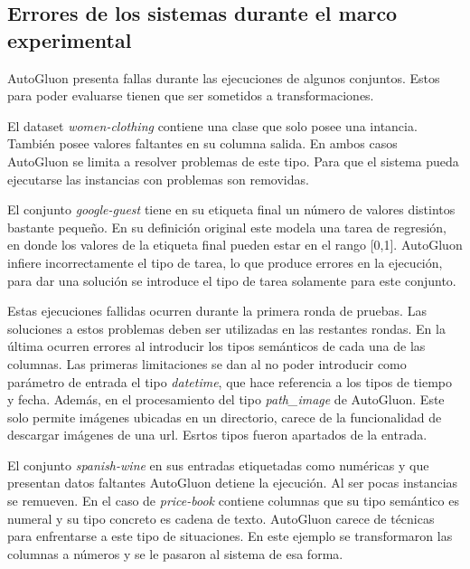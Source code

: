 

\subsection{Errores de los sistemas durante el marco experimental}\label{subsection:errors}
AutoGluon presenta fallas durante las ejecuciones de algunos conjuntos. Estos para poder evaluarse tienen que ser sometidos a transformaciones.

El dataset \textit{women-clothing} contiene una clase que solo posee una intancia. También posee valores faltantes en su columna salida. En ambos casos AutoGluon se 
limita a resolver problemas de este tipo. Para que el sistema pueda ejecutarse las instancias con problemas son removidas.

El conjunto \textit{google-guest} tiene en su etiqueta final un número de valores distintos bastante pequeño. En su definición original este modela una tarea de regresión, en 
donde los valores de la etiqueta final pueden estar en el rango [0,1]. AutoGluon infiere incorrectamente el tipo de tarea, lo que produce errores en la ejecución, para 
dar una solución se introduce el tipo de tarea solamente para este conjunto.

Estas ejecuciones fallidas ocurren durante la primera ronda de pruebas. Las soluciones a estos problemas deben ser utilizadas en las restantes rondas. 
En la última ocurren errores al introducir los tipos semánticos de cada una de las columnas. Las primeras limitaciones se dan al no poder introducir como 
parámetro de entrada el tipo \textit{datetime}, que hace referencia a los tipos de tiempo y fecha. Además, en el procesamiento del tipo \textit{path\_image} de AutoGluon. 
Este solo permite imágenes ubicadas en un directorio, carece de la funcionalidad de descargar imágenes de una url.  Esrtos tipos fueron apartados de la entrada.

El conjunto \textit{spanish-wine} en sus entradas etiquetadas como numéricas y que presentan datos faltantes AutoGluon detiene la ejecución. Al ser pocas instancias 
se remueven.
En el caso de \textit{price-book} contiene columnas que su tipo semántico es numeral y su tipo concreto es cadena de texto. AutoGluon carece de técnicas para 
enfrentarse a este tipo de situaciones. En este ejemplo se transformaron las columnas a números y se le pasaron al sistema de esa forma.

